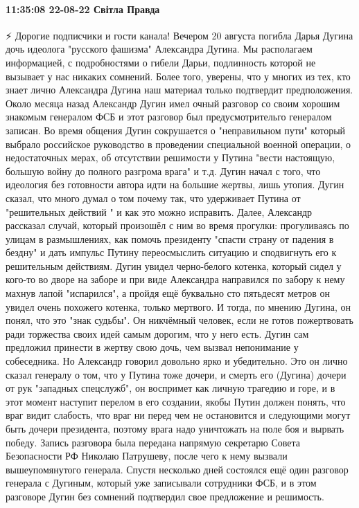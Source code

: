  
 
 
 
 

\paragraph{11:35:08 22-08-22 Світла Правда}

⚡️ Дорогие подписчики и гости канала! Вечером 20 августа погибла Дарья Дугина дочь идеолога "русского фашизма" Александра Дугина. Мы располагаем информацией, с подробностями о гибели Дарьи, подлинность которой не вызывает у нас никаких сомнений. Более того, уверены, что у многих из тех, кто знает лично Александра Дугина наш материал только подтвердит предположения.
Около месяца назад Александр Дугин имел очный разговор со своим хорошим знакомым генералом ФСБ и этот разговор был предусмотрительго генералом записан. Во время общения Дугин сокрушается о "неправильном пути" который выбрало российское руководство в проведении специальной военной операции, о недостаточных мерах, об отсутствии решимости у Путина "вести настоящую, большую войну до полного разгрома врага" и т.д. Дугин начал с того, что идеология без готовности автора идти на большие жертвы, лишь утопия. Дугин сказал, что много думал о том почему так, что удерживает Путина от "решительных действий " и как это можно исправить. Далее, Александр рассказал случай, который произошёл с ним во время прогулки: прогуливаясь по улицам в размышлениях, как помочь президенту "спасти страну от падения в бездну" и дать импульс Путину переосмыслить ситуацию и сподвигнуть его к решительным действиям. Дугин увидел черно-белого котенка, который сидел у кого-то во дворе на заборе и при виде Александра направился по забору к нему махнув лапой "испарился", а пройдя ещё буквально сто пятьдесят метров он увидел очень похожего котенка, только мертвого. И тогда, по мнению Дугина, он понял, что это "знак судьбы". Он никчёмный человек, если не готов пожертвовать ради торжества своих идей самым дорогим, что у него есть.
Дугин сам предложил принести в жертву свою дочь, чем вызвал непонимание у собеседника. Но Александр говорил довольно ярко и убедительно. Это он лично сказал генералу о том, что у Путина тоже дочери, и смерть его (Дугина) дочери от рук "западных спецслужб", он воспримет как личную трагедию и горе, и в этот момент наступит перелом в его создании, якобы Путин должен понять, что враг видит слабость, что враг ни перед чем не остановится и следующими могут быть дочери президента, поэтому врага надо уничтожать на поле боя и вырвать победу. Запись разговора была передана напрямую секретарю Совета Безопасности РФ Николаю Патрушеву, после чего к нему вызвали вышеупомянутого генерала. Спустя несколько дней состоялся ещё один разговор генерала с Дугиным, который уже записывали сотрудники ФСБ, и в этом разговоре Дугин без сомнений подтвердил свое предложение и решимость.
